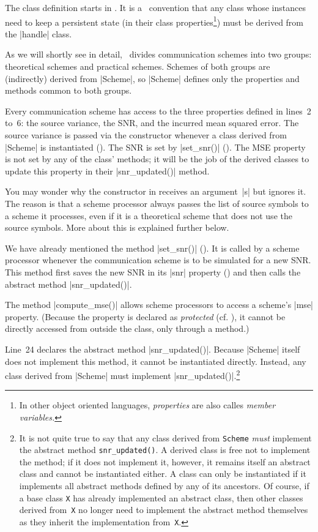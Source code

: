The class definition starts in . It is a \matlab\ convention that any
class whose instances need to keep a persistent state (in their class
properties\footnote{In other object oriented languages, \emph{properties}
are also calles \emph{member variables.}}) must be derived from the |handle|
class. 

As we will shortly see in detail, \jscsim\ divides communication schemes into
two groups: theoretical schemes and practical schemes. Schemes of both
groups are (indirectly) derived from |Scheme|, so |Scheme| defines only the
properties and methods common to both groups.

Every communication scheme has access to the three properties defined in
lines~2 to~6: the source variance, the SNR, and the incurred mean squared error.
The source variance is passed via the constructor whenever a class derived from
|Scheme| is instantiated (). The SNR is set by |set_snr()|
(). The MSE property is not set by any of the class' methods; it
will be the job of the derived classes to update this property in their
|snr_updated()| method. 

You may wonder why the constructor in  receives an argument~|s| but
ignores it. The reason is that a scheme processor always passes the list of
source symbols to a scheme it processes, even if it is a theoretical scheme that
does not use the source symbols. More about this is explained further below.

We have already mentioned the method |set_snr()| (). It is called by
a scheme processor whenever the communication scheme is to be simulated for a
new SNR. This method first saves the new SNR in its |snr| property
() and then calls the abstract method |snr_updated()|. 

The method |compute_mse()| allows scheme processors to access a scheme's
|mse| property. (Because the property is declared as \emph{protected} (cf.
), it cannot be directly accessed from outside the class, only
through a method.) 

Line~24 declares the abstract method |snr_updated()|. Because |Scheme| itself
does not implement this method, it cannot be instantiated directly. Instead, any
class derived from |Scheme| must implement |snr_updated()|.\footnote{It is not
quite true to say that any class derived from \texttt{Scheme} \emph{must}
implement the abstract method \texttt{snr\_updated()}. A derived class is free
not to implement the method; if it does not implement it, however, it remains
itself an abstract class and cannot be instantiated either. A class can only be
instantiated if it implements all abstract methods defined by any of its
ancestors. Of course, if a base class \texttt{X} has already implemented an
abstract class, then other classes derived from~\texttt{X} no longer need to
implement the abstract method themselves as they inherit the implementation
from~\texttt{X}.}


